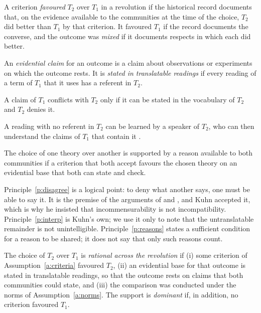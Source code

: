 \documentclass{situationist-preprint}
\begin{document}
\begin{definition}[Outcome]\label{d:favour}
A criterion \emph{favoured} $T_2$ over $T_1$ in a revolution if the historical record documents that, on the evidence available to the communities at the time of the choice, $T_2$ did better than $T_1$ by that criterion. It favoured $T_1$ if the record documents the converse, and the outcome was \emph{mixed} if it documents respects in which each did better.
\end{definition}

\begin{definition}\label{d:evbase}
An \emph{evidential claim} for an outcome is a claim about observations or experiments on which the outcome rests. It is \emph{stated in translatable readings} if every reading of a term of $T_1$ that it uses has a referent in $T_2$.
\end{definition}

\begin{principle}\label{p:disagree}
A claim of $T_1$ conflicts with $T_2$ only if it can be stated in the vocabulary of $T_2$ and $T_2$ denies it.
\end{principle}

\begin{principle}[Interpretation]\label{p:interp}
A reading with no referent in $T_2$ can be learned by a speaker of $T_2$, who can then understand the claims of $T_1$ that contain it \citep{Kuhn1983}.
\end{principle}

\begin{principle}\label{p:reasons}
The choice of one theory over another is supported by a reason available to both communities if a criterion that both accept favours the chosen theory on an evidential base that both can state and check.
\end{principle}

Principle~\ref{p:disagree} is a logical point: to deny what another says, one must be able to say it. It is the premise of the arguments of \citet{Davidson1974} and \citet{Putnam1981}, and Kuhn accepted it, which is why he insisted that incommensurability is not incompatibility. Principle~\ref{p:interp} is Kuhn's own; we use it only to note that the untranslatable remainder is not unintelligible. Principle~\ref{p:reasons} states a sufficient condition for a reason to be shared; it does not say that only such reasons count.

\begin{definition}\label{d:rational}
The choice of $T_2$ over $T_1$ is \emph{rational across the revolution} if (i) some criterion of Assumption~\ref{a:criteria} favoured $T_2$, (ii) an evidential base for that outcome is stated in translatable readings, so that the outcome rests on claims that both communities could state, and (iii) the comparison was conducted under the norms of Assumption~\ref{a:norms}. The support is \emph{dominant} if, in addition, no criterion favoured $T_1$.
\end{definition}
\end{document}
